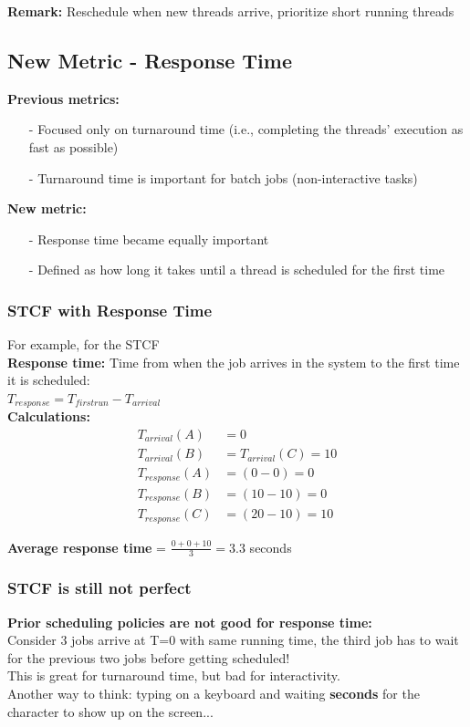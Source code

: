 \documentclass[../../compsys.tex]{subfiles}
\begin{document}
\textbf{Remark:} Reschedule when new threads arrive, prioritize short running threads
\subsection{New Metric  - Response Time}
\textbf{Previous metrics:}\\[5px]
\begin{itemize}
    \item[-] Focused only on turnaround time (i.e., completing the threads' execution as fast as possible)
    \item[-] Turnaround time is important for batch jobs (non-interactive tasks)
\end{itemize}

\textbf{New metric:}\\[5px]
\begin{itemize}
    \item[-] Response time became equally important
    \item[-] Defined as how long it takes until a thread is scheduled for the first time
\end{itemize}
\subsubsection{STCF with Response Time}
For example, for the STCF\\
\textbf{Response time:} Time from when the job arrives in the system to the first time it is scheduled:\\[3px]
$T_{response} = T_{firstrun} - T_{arrival}$\\[5px]

\textbf{Calculations:}\\[5px]
\begin{align*}
    T_{arrival}(A) &= 0 \\
    T_{arrival}(B) &= T_{arrival}(C) = 10 \\
    T_{response}(A) &= (0 - 0) = 0 \\
    T_{response}(B) &= (10 - 10) = 0 \\
    T_{response}(C) &= (20 - 10) = 10
\end{align*}

\textbf{Average response time} = $\frac{0 + 0 + 10}{3} = 3.3$ seconds\\[5px]
\subsubsection{STCF is still not perfect}
\textbf{Prior scheduling policies are not good for response time:}\\[5px]
Consider 3 jobs arrive at T=0 with same running time, the third job has to wait for the previous two jobs before getting scheduled!\\
This is great for turnaround time, but bad for interactivity.\\
Another way to think: typing on a keyboard and waiting \textbf{seconds} for the character to show up on the screen...
\end{document}
